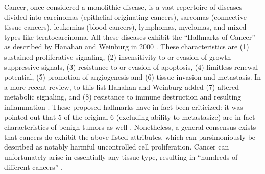 \documentclass[12pt]{article}
\begin{document}
Cancer, once considered a monolithic disease, is a vast repertoire of diseases divided into carcinomas (epithelial-originating cancers), sarcomas (connective tissue cancers), leukemias (blood cancers), lymphomas, myelomas, and mixed types like teratocarcinoma. All these diseases exhibit the \textquotedblleft Hallmarks of Cancer\textquotedblright \: as described by Hanahan and Weinburg in 2000 \cite{Hanahan2000}. These characteristics are (1) sustained proliferative signaling, (2) insensitivity to or evasion of growth-suppressive signals, (3) resistance to or evasion of apoptosis, (4) limitless renewal potential, (5) promotion of angiogenesis and (6) tissue invasion and metastasis. In a more recent review, to this list Hanahan and Weinburg added (7) altered metabolic signaling, and (8) resistance to immune destruction and resulting inflammation \cite{Hanahan2011}. These proposed hallmarks have in fact been criticized: it was pointed out that 5 of the original 6 (excluding ability to metastasize) are in fact characteristics of benign tumors as well \cite{Lazebnik2010}. Nonetheless, a general consensus exists that cancers do exhibit the above listed attributes, which can parsimoniously be described as notably harmful uncontrolled cell proliferation. Cancer can unfortunately arise in essentially any tissue type, resulting in \textquotedblleft hundreds of different cancers\textquotedblright \: \cite{CancerGovClasses}.  
\end{document}
